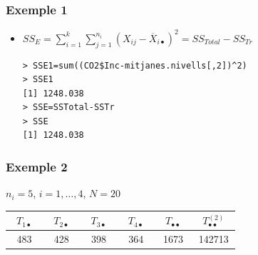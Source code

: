 \documentclass[12pt,t]{beamer}
\theoremstyle{plain}
\theoremstyle{definition}
\begin{document}
\begin{frame}[fragile]
\frametitle{Exemple 1}
\begin{itemize}
\item  $SS_E=\sum\limits_{i=1}^k\sum\limits_{j=1}^{n_i} (X_{ij}-\overline{X}_{i\bullet})^2=SS_{Total}-SS_{Tr}$
\medskip

\hspace*{-3ex}\begin{minipage}{\textwidth}
\begin{verbatim}
> SSE1=sum((CO2$Inc-mitjanes.nivells[,2])^2)
> SSE1
[1] 1248.038
> SSE=SSTotal-SSTr
> SSE
[1] 1248.038
\end{verbatim}
\end{minipage}
\end{itemize}
\end{frame}


\begin{frame}
\frametitle{Exemple 2}
$n_i=5$, $i=1,\ldots,4$, $N=20$
\medskip

\begin{center}
\begin{tabular}{c|c|c|c|c|c}
\ ${T_{1\bullet}}$\ {} & \ ${T_{2\bullet}}$\ {} & \ ${T_{3\bullet}}$\ {} & \ ${T_{4\bullet}}$\ {} & \ $T_{\bullet\bullet}$\ {} & \ $T_{\bullet\bullet}^{(2)}$\ {} \\
\hline
483 &
428 &
398 &
364 &
1673 &
142713
\end{tabular}
\end{center}
\medskip

\end{frame}
\end{document}
